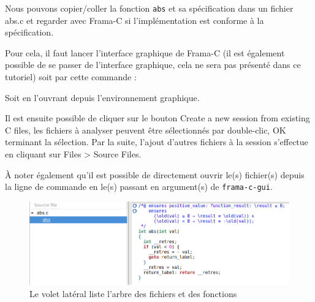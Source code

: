 \documentclass[12pt,francais,]{scrbook}
\newenvironment{Shaded}{}{}
\newcommand{\KeywordTok}[1]{\textcolor[rgb]{0.00,0.44,0.13}{\textbf{{#1}}}}
\newcommand{\NormalTok}[1]{{#1}}
\begin{document}
Nous pouvons copier/coller la fonction \texttt{abs} et sa spécification
dans un fichier abs.c et regarder avec Frama-C si l'implémentation est
conforme à la spécification.

Pour cela, il faut lancer l'interface graphique de Frama-C (il est
également possible de se passer de l'interface graphique, cela ne sera
pas présenté dans ce tutoriel) soit par cette commande :

\begin{footnotesize}\begin{Shaded}
\end{Shaded}\end{footnotesize}

Soit en l'ouvrant depuis l'environnement graphique.

Il est ensuite possible de cliquer sur le bouton \og{}Create a new session
from existing C files\fg{}, les fichiers à analyser peuvent être
sélectionnés par double-clic, OK terminant la sélection. Par la suite,
l'ajout d'autres fichiers à la session s'effectue en cliquant sur Files
\textgreater{} Source Files.

À noter également qu'il est possible de directement ouvrir le(s)
fichier(s) depuis la ligne de commande en le(s) passant en argument(s)
de \texttt{frama-c-gui}.

\begin{footnotesize}\begin{Shaded}
\end{Shaded}\end{footnotesize}

\begin{figure}[htbp]
\centering
\includegraphics[scale=0.5]{2-1-1-abs-1.png}
\caption{Le volet latéral liste l'arbre des fichiers et des fonctions}
\label{fig:2-1-1-abs-1}
\end{figure}
\end{document}
